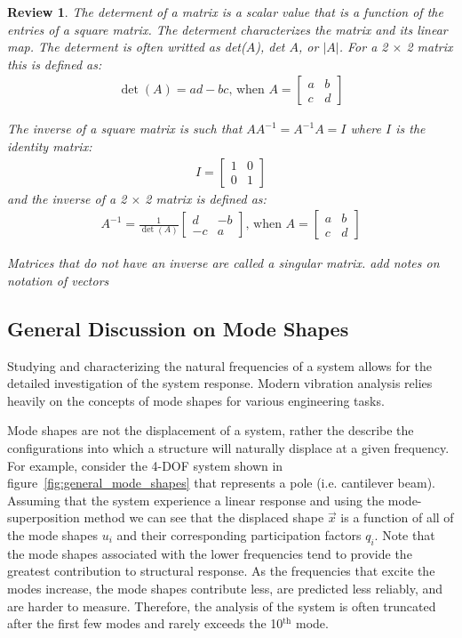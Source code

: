 \documentclass[12pt,letter]{article}
\numberwithin{ex}{section} %
\newtheorem{re}{Review}
\numberwithin{re}{section} %
\newenvironment{review}{\begin{mdframed}[middlelinewidth=2mm,roundcorner=20pt]\begin{re}\normalfont}{\end{re}\end{mdframed}}
\newcommand{\rd}[1]{\textcolor[rgb]{0.75,0.00,0.00}{#1}}
\begin{document}
\begin{review}
The determent of a matrix is a scalar value that is a function of the entries of a square matrix. The determent characterizes the matrix and its linear map. The determent is often writted as det($A$), det $A$, or $|A|$. For a 2 $\times$ 2 matrix this is defined as:
\begin{eqnarray}
\det (A) = ad-bc  \text{, when } A = \begin{bmatrix} a & b \\ c & d \end{bmatrix}
\end{eqnarray}

The inverse of a square matrix is such that $AA^{-1} = A^{-1}A=I$ where $I$ is the identity matrix:
\begin{eqnarray}
I = \begin{bmatrix} 1 & 0 \\ 0 & 1 \end{bmatrix} 
\end{eqnarray}
and the inverse of a 2 $\times$ 2 matrix is defined as:
\begin{eqnarray}
A^{-1} = \frac{1}{\det (A)} \begin{bmatrix} d & -b \\ -c & a \end{bmatrix} \text{, when } A = \begin{bmatrix} a & b \\ c & d \end{bmatrix}
\end{eqnarray}

Matrices that do not have an inverse are called a singular matrix.  \rd{add notes on notation of vectors}
\end{review}

\subsection{General Discussion on Mode Shapes}

Studying and characterizing the natural frequencies of a system allows for the detailed investigation of the system response. Modern vibration analysis relies heavily on the concepts of mode shapes for various engineering tasks. 


Mode shapes are not the displacement of a system, rather the describe the configurations into which a structure will naturally displace at a given frequency. For example, consider the 4-DOF system shown in figure~\ref{fig:general_mode_shapes} that represents a pole (i.e. cantilever beam). Assuming that the system experience a linear response and using the mode-superposition method we can see that the displaced shape $\vec{x}$ is a function of all of the mode shapes $u_i$ and their corresponding participation factors $q_i$. Note that the mode shapes associated with the lower frequencies tend to provide the greatest contribution to structural response. As the frequencies that excite the modes increase, the mode shapes contribute less, are predicted less reliably, and are harder to measure. Therefore, the analysis of the system is often truncated after the first few modes and rarely exceeds the 10$^{\text{th}}$ mode. 
\end{document}
